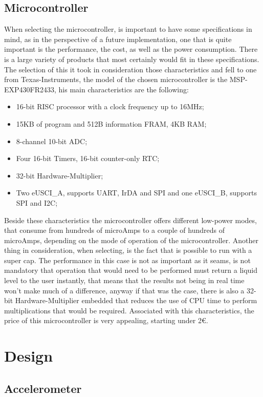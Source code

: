 \subsection{Microcontroller}
When selecting the microcontroller, is important to have some specifications in mind, as in the perspective of a future implementation, one that is quite important is the performance, the cost, as well as the power consumption. There is a large variety of products that most certainly would fit in these specifications. The selection of this it took in consideration those characteristics and fell to one from Texas-Instruments, the model of the chosen microcontroller is the MSP-EXP430FR2433, his main characteristics are the following:
\begin{itemize}
    \item 16-bit RISC processor with a clock frequency up to 16MHz;
    \item 15KB of program and 512B information FRAM, 4KB RAM;
    \item 8-channel 10-bit ADC;
    \item Four 16-bit Timers, 16-bit counter-only RTC;
    \item 32-bit Hardware-Multiplier;
    \item Two eUSCI\_A, supports UART, IrDA and SPI and one eUSCI\_B, supports SPI and I2C;
\end{itemize}
Beside these characteristics the microcontroller offers different low-power modes, that consume from hundreds of microAmps to a couple of hundreds of microAmps, depending on the mode of operation of the microcontroller. Another thing in consideration, when selecting, is the fact that is possible to run with a super cap. The performance in this case is not as important as it seams, is not mandatory that operation that would need to be performed must return a liquid level to the user instantly, that means that the results not being in real time won't make much of a difference, anyway if that was the case, there is also a 32-bit Hardware-Multiplier embedded that reduces the use of CPU time to perform multiplications that would be required\cite{MSP430FR2433DataSheet}. Associated with this characteristics, the price of this microcontroller is very appealing, starting under 2€.
\section{Design}
\subsection{Accelerometer}
